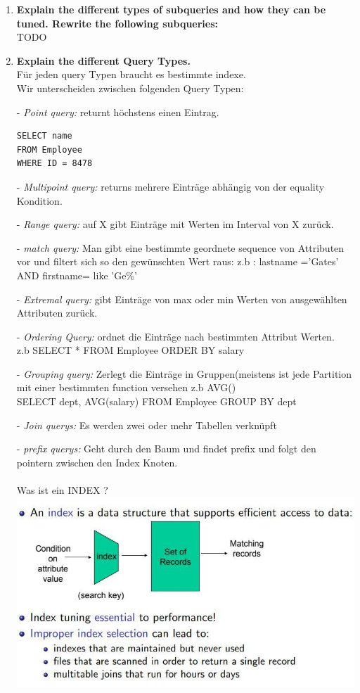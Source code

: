 \documentclass[12pt]{article}\pagestyle{myheadings}
\theoremstyle{plain}
\begin{document}
\begin{enumerate}
\item \textbf{Explain the different types of subqueries and how they can be tuned. Rewrite the following subqueries:} \\TODO\\
\item \textbf{Explain the different Query Types.}\\Für jeden query Typen braucht es bestimmte indexe.\\
Wir unterscheiden zwischen folgenden Query Typen: \item[-]\textit{Point query: }returnt höchstens einen Eintrag.
\begin{verbatim}
SELECT name
FROM Employee
WHERE ID = 8478
\end{verbatim}
\item[-]\textit{Multipoint query: }returns mehrere Einträge abhängig von der equality Kondition.
\item[-]\textit{Range query: }auf X gibt Einträge mit Werten im Interval von X zurück.
\item[-]\textit{match query: }Man gibt eine bestimmte geordnete sequence von Attributen vor und filtert sich so den gewünschten Wert raus:
z.b : lastname ='Gates' AND firstname= like 'Ge\%'
\item[-]\textit{Extremal query: }gibt Einträge von max oder min Werten von ausgewählten Attributen zurück.
\item[-]\textit{Ordering Query: }ordnet die Einträge nach bestimmten Attribut Werten.\\
z.b SELECT * FROM Employee ORDER BY salary
\item[-]\textit{Grouping query: }Zerlegt die Einträge in Gruppen(meistens ist jede Partition mit einer bestimmten function versehen z.b AVG()\\SELECT dept, AVG(salary)
FROM Employee
GROUP BY dept
\item[-]\textit{Join querys: }Es werden zwei oder mehr Tabellen verknüpft\\
\item[-]\textit{prefix querys: }Geht durch den Baum und findet prefix und folgt den pointern zwischen den Index Knoten.
\\ \\
\newpage
Was ist ein INDEX ?\\
\includegraphics[scale=0.8]{what_is_an_Index.jpg}\\

\end{enumerate}
\end{document}
